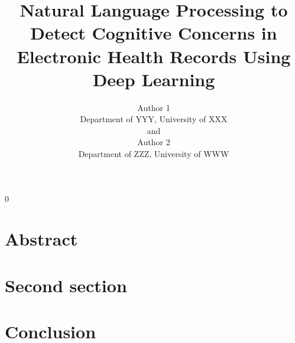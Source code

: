 \documentclass[12pt]{article}
\newcommand{\blind}{0}
\begin{document}
\blind {
    \title {
        \bf Natural Language Processing to Detect Cognitive Concerns in Electronic Health Records Using Deep Learning
    }
    
    \author {
        Author 1 \\
        Department of YYY, University of XXX\\
        and \\
        Author 2 \\
        Department of ZZZ, University of WWW
    }
    
    \maketitle
} \fi

\newpage
    \tableofcontents
\newpage

\section{Abstract}



\section{Second section}




\section{Conclusion}

\label{sec:conc}

%

%

\begin{thebibliography}{}

\end{thebibliography}
\end{document}
